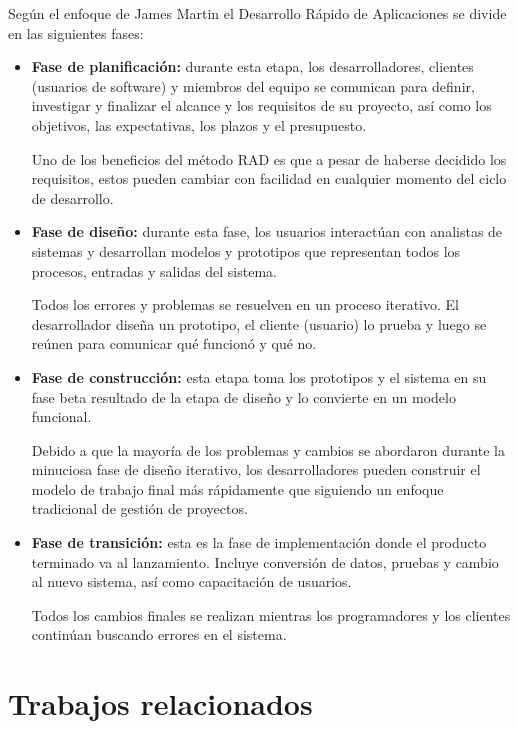 Según el enfoque de James Martin \cite{RADJamesMartin} el Desarrollo Rápido de Aplicaciones se divide en las siguientes fases:

\begin{itemize}
    \item \textbf{Fase de planificación:} durante esta etapa, los desarrolladores, clientes (usuarios de software) y miembros del equipo se comunican para definir, investigar y finalizar el alcance y los requisitos de su proyecto, así como los objetivos, las expectativas, los plazos y el presupuesto. 
    
    Uno de los beneficios del método RAD es que a pesar de haberse decidido los requisitos, estos pueden cambiar con facilidad en cualquier momento del ciclo de desarrollo.

    \item \textbf{Fase de diseño:} durante esta fase, los usuarios interactúan con analistas de sistemas y desarrollan modelos y prototipos que representan todos los procesos, entradas y salidas del sistema.
    
    Todos los errores y problemas se resuelven en un proceso iterativo. El desarrollador diseña un prototipo, el cliente (usuario) lo prueba y luego se reúnen para comunicar qué funcionó y qué no.

    \item \textbf{Fase de construcción:} esta etapa toma los prototipos y el sistema en su fase beta resultado de la etapa de diseño y lo convierte en un modelo funcional.

    Debido a que la mayoría de los problemas y cambios se abordaron durante la minuciosa fase de diseño iterativo, los desarrolladores pueden construir el modelo de trabajo final más rápidamente que siguiendo un enfoque tradicional de gestión de proyectos.

    \item \textbf{Fase de transición:} esta es la fase de implementación donde el producto terminado va al lanzamiento. Incluye conversión de datos, pruebas y cambio al nuevo sistema, así como capacitación de usuarios.

    Todos los cambios finales se realizan mientras los programadores y los clientes continúan buscando errores en el sistema.

\end{itemize}


\section{Trabajos relacionados}

